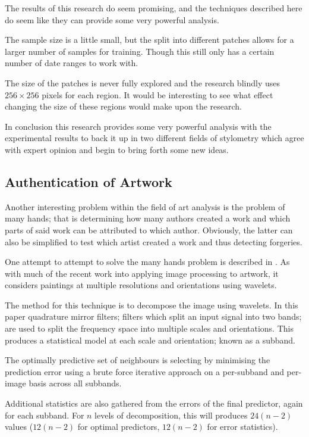 \documentclass[conference]{IEEEtran}
\begin{document}
The results of this research do seem promising, and the techniques described
here do seem like they can provide some very powerful analysis.

The sample size is a little small, but the split into different patches allows
for a larger number of samples for training. Though this still only has a
certain number of date ranges to work with.

The size of the patches is never fully explored and the research blindly uses
$256 \times 256$ pixels for each region. It would be interesting to see what
effect changing the size of these regions would make upon the research.

In conclusion this research provides some very powerful analysis with the
experimental results to back it up in two different fields of stylometry which
agree with expert opinion and begin to bring forth some new ideas.

\subsection{Authentication of Artwork}

Another interesting problem within the field of art analysis is the problem of
many hands; that is determining how many authors created a work and which parts
of said work can be attributed to which author. Obviously, the latter can also
be simplified to test which artist created a work and thus detecting forgeries.

One attempt to attempt to solve the many hands problem is described in
\cite{lyu2004digital}. As with much of the recent work into applying image
processing to artwork, it considers paintings at multiple resolutions and
orientations using wavelets.

The method for this technique is to decompose the image using wavelets. In this
paper quadrature mirror filters; filters which split an input signal into two
bands; are used to split the frequency space into multiple scales and
orientations. This produces a statistical model at each scale and orientation;
known as a subband.

The optimally predictive set of neighbours is selecting by minimising the
prediction error using a brute force iterative approach on a per-subband and
per-image basis across all subbands.

Additional statistics are also gathered from the errors of the final predictor,
again for each subband. For $n$ levels of decomposition, this will produces
$24(n-2)$ values ($12(n-2)$ for optimal predictors, $12(n-2)$ for error
statistics).
\end{document}
